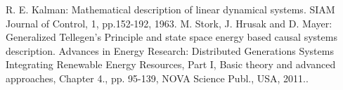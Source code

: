 

\begin{thebibliography}{10}

 R. E. Kalman: Mathematical description of linear dynamical systems. SIAM Journal of Control, 1, pp.152-192, 1963.
{\sc M. Stork, J. Hrusak and D. Mayer}: {Generalized Tellegen's Principle and state space energy based causal systems description}. Advances in Energy Research: Distributed Generations Systems Integrating Renewable Energy Resources, Part I, Basic theory and advanced approaches, Chapter 4., pp. 95-139, NOVA Science Publ., USA, 2011..

\end{thebibliography}
